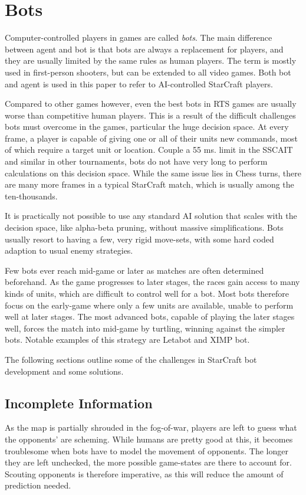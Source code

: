 \section{Bots}
Computer-controlled players in games are called \emph{bots}. The main difference between agent and bot is that bots are always a replacement for players, and they are usually limited by the same rules as human players. The term is mostly used in first-person shooters, but can be extended to all video games. Both bot and agent is used in this paper to refer to AI-controlled StarCraft players.

Compared to other games however, even the best bots in RTS games are usually worse than competitive human players. This is a result of the difficult challenges bots must overcome in the games, particular the huge decision space. At every frame, a player is capable of giving one or all of their units new commands, most of which require a target unit or location. Couple a 55 ms. limit in the SSCAIT and similar in other tournaments, bots do not have very long to perform calculations on this decision space. While the same issue lies in Chess turns, there are many more frames in a typical StarCraft match, which is usually among the ten-thousands.

It is practically not possible to use any standard AI solution that scales with the decision space, like alpha-beta pruning, without massive simplifications. Bots usually resort to having a few, very rigid move-sets, with some hard coded adaption to usual enemy strategies.

Few bots ever reach mid-game or later as matches are often determined beforehand. As the game progresses to later stages, the races gain access to many kinds of units, which are difficult to control well for a bot. Most bots therefore focus on the early-game where only a few units are available, unable to perform well at later stages. The most advanced bots, capable of playing the later stages well, forces the match into mid-game by turtling, winning against the simpler bots. Notable examples of this strategy are Letabot and XIMP bot.

The following sections outline some of the challenges in StarCraft bot development and some solutions.

	\subsection*{Incomplete Information}
	As the map is partially shrouded in the fog-of-war, players are left to guess what the opponents' are scheming. While humans are pretty good at this, it becomes troublesome when bots have to model the movement of opponents. The longer they are left unchecked, the more possible game-states are there to account for. Scouting opponents is therefore imperative, as this will reduce the amount of prediction needed.
	
